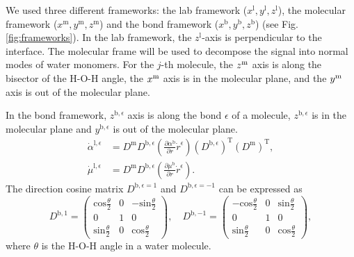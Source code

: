 %
We used three different frameworks: the lab framework ($x^{\text{l}},y^{\text{l}},z^{\text{l}}$), the molecular framework 
($x^{\text{m}},y^{\text{m}},z^{\text{m}}$) and the bond framework ($x^{\text{b}},y^{\text{b}},z^{\text{b}}$) (see Fig.\thinspace\ref{fig:frameworks}).
In the lab framework, the $z^{\text{l}}$-axis is perpendicular to the interface. 
The molecular frame will be used to decompose the signal into normal modes of water monomers. 
For the $j$-th molecule, the $z^{\text m}$ axis is along the bisector of the H-O-H angle, the $x^{\text m}$ axis is in the molecular plane, 
and the $y^{\text m}$ axis is out of the molecular plane\cite{Khatib2017}. 

In the bond framework, $z^{\text{b},\epsilon}$ axis is along the bond $\epsilon$ of a molecule, $z^{\text{b},\epsilon}$
is in the molecular plane and $y^{\text{b},\epsilon}$ is out of the molecular plane.
\begin{align}
  \dot{\alpha}^{\text{l},\epsilon} &= {{D}}^{\text{m}}{{D}}^{\text{b},\epsilon}(\frac{\partial{\alpha}^{\text{b}}}{\partial r}\dot
    r^{\epsilon})({D}^{\text{b},\epsilon})^{\text{T}}({D}^{\text{m}})^{\text{T}}, \\ 
    \dot\mu^{\text{l},\epsilon} &= {{D}}^{\text{m}}{{D}}^{\text{b},\epsilon}(\frac{\partial \mu^{\text{b}}}{\partial r}\dot r^{\epsilon}).
    \label{eq:dot_mu-alpha}
 \end{align}
The direction cosine matrix ${{D}}^{\text{b},\epsilon=1}$ and ${{D}}^{\text{b},\epsilon=-1}$ can be expressed as 
\begin{equation}
    {{D}}^{\text{b},1}=\left(
                \begin{matrix}
                    \text{cos}\frac{\theta}{2} &  0  & -\text{sin}\frac{\theta}{2}\\
                    0 & 1 & 0\\
                    \text{sin}\frac{\theta}{2} & 0 & \text{cos}\frac{\theta}{2}
\end{matrix}
\right),\quad
    {{D}}^{\text{b},-1}=\left(
         \begin{matrix}
             -\text{cos}\frac{\theta}{2} & 0 & \text{sin}\frac{\theta}{2}\\
             0 & 1 & 0\\
             \text{sin}\frac{\theta}{2} & 0  & \text{cos}\frac{\theta}{2}
\end{matrix}
\right),
\label{eq:D_b}
\end{equation}
where $\theta$ is the H-O-H angle in a water molecule.
